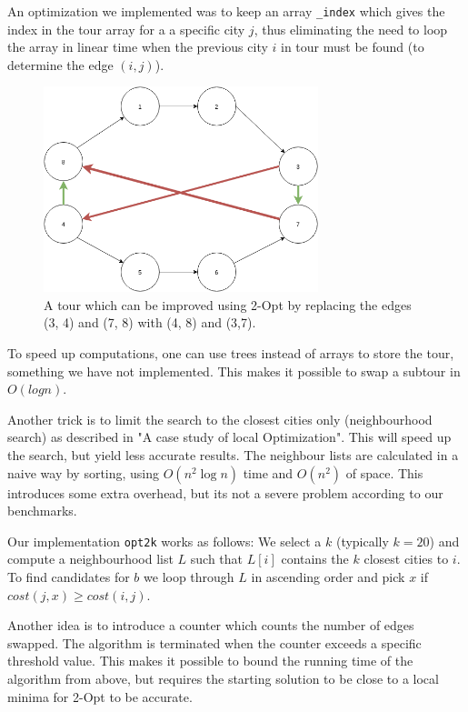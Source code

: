 \documentclass{report}
\begin{document}
An optimization we implemented was to keep an array \verb!_index! which gives the index in the tour array for a a specific city $j$, thus eliminating the need to loop the array in linear time when the previous city $i$ in tour must be found (to determine the edge $(i, j)$).

\begin{figure}[ht]
\centering
\includegraphics[width=80mm]{2-Opt}
\caption{A tour which can be improved using 2-Opt by replacing the edges (3, 4) and (7, 8) with (4, 8) and (3,7).}
\end{figure}

To speed up computations, one can use trees instead of arrays to store the tour, something we have not implemented. This makes it possible to swap a subtour in $O(log n)$. 

Another trick is to limit the search to the closest cities only (neighbourhood search) as described in "A case study of local Optimization"\cite{JohMcg97}. This will speed up the search, but yield less accurate results. The neighbour lists are calculated in a naive way by sorting, using $O(n^2\log n)$ time and $O(n^2)$ of space. This introduces some extra overhead, but its not a severe problem according to our benchmarks.

Our implementation \verb!opt2k! works as follows: We select a $k$ (typically $k=20$) and compute a neighbourhood list $L$ such that $L[i]$ contains the $k$ closest cities to $i$. To find candidates for $b$ we loop through $L$ in ascending order and pick $x$ if $cost(j, x) \ge cost(i, j)$. 

Another idea is to introduce a counter which counts the number of edges swapped. The algorithm is terminated when the counter exceeds a specific threshold value. This makes it possible to bound the running time of the algorithm from above, but requires the starting solution to be close to a local minima for 2-Opt to be accurate.
\end{document}
